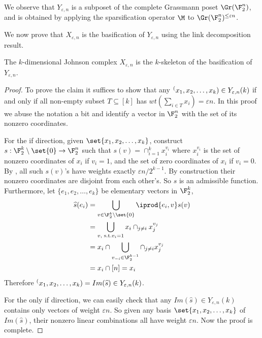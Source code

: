 \begin{remark}
    We observe that $Y_{\varepsilon,n}$ is a subposet of the complete Grassmann poset $\Gr(\F_2^n)$, and is obtained by applying the sparsification operator $\M$ to  $\Gr(\F_2^n)^{\le \varepsilon n}$.
\end{remark}

We now prove that $X_{\varepsilon,n}$ is the basification of $Y_{\varepsilon,n}$ using the link decomposition result.

\begin{claim}\label{claim:Johnson-basification}
    The $k$-dimensional Johnson complex $X_{\varepsilon,n}$ is the $k$-skeleton of the basification of $Y_{\varepsilon,n}$.
\end{claim} 

\begin{proof}
    To prove the claim it suffices to show that any $\sp(x_1, x_2, \dots, x_k)\in Y_{\varepsilon,n}(k)$ if and only if all non-empty subset $T \subseteq [k]$ has $wt(\sum_{i \in T}x_i) = \varepsilon n$. In this proof we abuse the notation a bit and identify a vector in $\F_2^n$ with the set of its nonzero coordinates.
    
    For the if direction, given $\set{x_1,x_2,\dots,x_k}$, construct $s:\F_2^{k}\setminus \set{0} \to \F_2^n$ such that $s(v) = \cap_{i=1}^{k} x_i^{v_i}$ where $x_i^{v_i}$ is the set of nonzero coordinates of $x_i$ if $v_i = 1$, and the set of zero coordinates of $x_i$ if $v_i = 0$. By , all such $s(v)$'s have weights exactly $\varepsilon n/2^{k-1}$. By construction their nonzero coordinates are disjoint from each other's. So $s$ is an admissible function. Furthermore, let $\{e_1, e_2,\dots,e_k\}$ be elementary vectors in $\F_2^k$,
    \begin{align*}
        \widehat{s}(e_i) &= \bigcup_{v \in \F_2^k\setminus \set{0}} \iprod{e_i, v} s(v) \\
        &= \bigcup_{v, \text{ s.t.} v_i=1} x_i \cap_{j\neq i} x_j^{v_j} \\
        &= x_i \cap \bigcup_{v_{-i}\in \F_2^{k-1}} \cap_{j\neq i}x_j^{v_j} \\
        &= x_i \cap [n] = x_i
    \end{align*}
    Therefore $\sp(x_1,x_2,\dots,x_k) = Im(\widehat{s}) \in Y_{\varepsilon,n}(k)$.

    For the only if direction, we can easily check that any $Im(\widehat{s})\in Y_{\varepsilon,n}(k)$ contains only vectors of weight $\varepsilon n$. So given any basis $\set{x_1,x_2,\dots,x_k}$ of $Im(\widehat{s})$, their nonzero linear combinations all have weight $\varepsilon n$. Now the proof is complete.
\end{proof}





